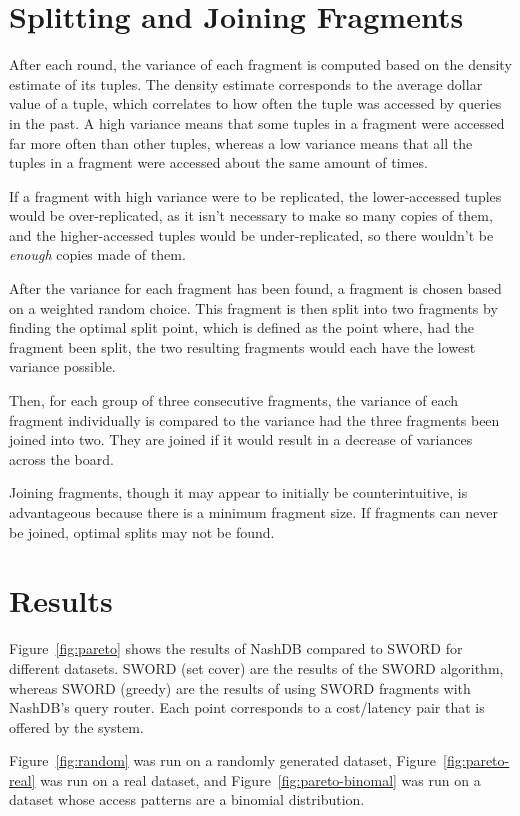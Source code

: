 \documentclass{brandiss}
\numberwithin{section}{chapter}
\numberwithin{figure}{chapter}
\theoremstyle{definition}
\theoremstyle{plain}
\theoremstyle{remark}
\begin{document}
\section{Splitting and Joining Fragments}

After each round, the variance of each fragment is computed based on the density estimate of its tuples. The density estimate corresponds to the average dollar value of a tuple, which correlates to how often the tuple was accessed by queries in the past. A high variance means that some tuples in a fragment were accessed far more often than other tuples, whereas a low variance means that all the tuples in a fragment were accessed about the same amount of times.

If a fragment with high variance were to be replicated, the lower-accessed tuples would be over-replicated, as it isn't necessary to make so many copies of them, and the higher-accessed tuples would be under-replicated, so there wouldn't be \textit{enough} copies made of them.

After the variance for each fragment has been found, a fragment is chosen based on a weighted random choice. This fragment is then split into two fragments by finding the optimal split point, which is defined as the point where, had the fragment been split, the two resulting fragments would each have the lowest variance possible.

Then, for each group of three consecutive fragments, the variance of each fragment individually is compared to the variance had the three fragments been joined into two. They are joined if it would result in a decrease of variances across the board.

Joining fragments, though it may appear to initially be counterintuitive, is advantageous because there is a minimum fragment size. If fragments can never be joined, optimal splits may not be found.

\section{Results}

Figure~\ref{fig:pareto} shows the results of NashDB compared to SWORD for different datasets. SWORD (set cover) are the results of the SWORD algorithm, whereas SWORD (greedy) are the results of using SWORD fragments with NashDB's query router. Each point corresponds to a cost/latency pair that is offered by the system.

Figure~\ref{fig:random} was run on a randomly generated dataset, Figure~\ref{fig:pareto-real} was run on a real dataset, and Figure~\ref{fig:pareto-binomal} was run on a dataset whose access patterns are a binomial distribution.
\end{document}
